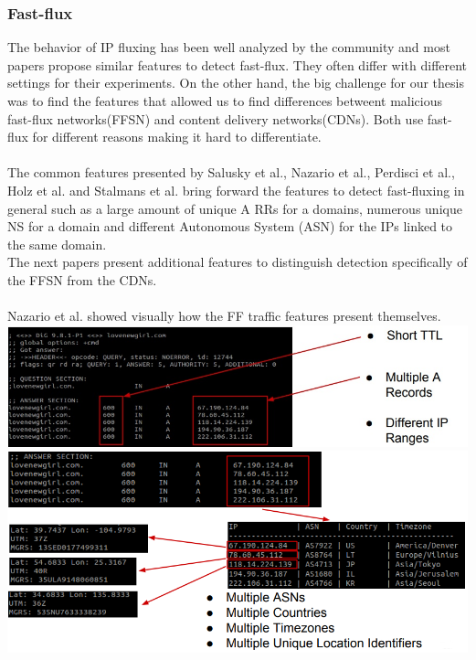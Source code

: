 \subsubsection{Fast-flux}
The behavior of IP fluxing has been well analyzed by the community and most papers propose similar features to detect fast-flux. They often differ with different settings for their experiments. On the other hand, the big challenge for our thesis was to find the features that allowed us to find differences betweent malicious fast-flux networks(FFSN) and content delivery networks(CDNs). Both use fast-flux for different reasons making it hard to differentiate.\\
\\
The common features presented by  Salusky et al.\cite{honeynet}, Nazario et al.\cite{ff1}, Perdisci et al.\cite{ff2}, Holz et al.\cite{ff3} and Stalmans et al.\cite{ff_botconf} bring forward the features to detect fast-fluxing in general such as a large amount of unique A RRs for a domains, numerous unique NS for a domain and different Autonomous System (ASN) for the IPs linked to the same domain. \\
The next papers present additional features to distinguish detection specifically of the FFSN from the CDNs. \\
\\
Nazario et al. \cite{ff1} showed visually how the FF traffic features present themselves.
\includegraphics[scale=.7]{img/ff_features.jpg}\\
\includegraphics[scale=.6]{img/ff_features_2.png}
